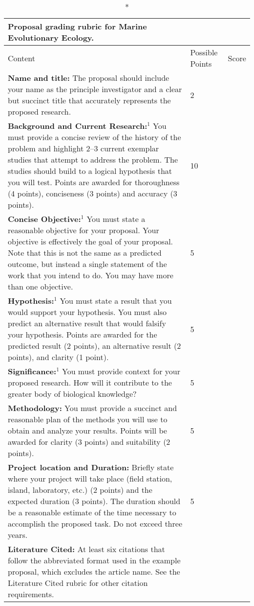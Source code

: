 \documentclass[10pt]{article}
\begin{document}
{\small
\begin{longtable}[l]{@{}L{11cm}C{3cm}L{1cm}@{}}
\caption*{\textbf{Proposal grading rubric for Marine Evolutionary Ecology.}}\\
\toprule
Content	&	Possible Points	&	Score \\
\midrule
\textbf{Name and title:}  The proposal should include your name as the principle investigator and a clear but succinct title that accurately represents the proposed research. &
2 & \\
\midrule%
\textbf{Background and Current Research:}$^1$  You must provide a concise review of the history of the problem and highlight 2--3 current exemplar studies that attempt to address the problem.  The studies should build to a logical hypothesis that you will test.  Points are awarded for thoroughness (4 points), conciseness (3 points) and accuracy (3 points). &
10 & \\
\midrule%
\textbf{Concise Objective:}$^1$  You must state a reasonable objective for your proposal.  Your objective is effectively the goal of your proposal.  Note that this is not the same as a predicted outcome, but instead a single statement of the work that you intend to do.  You may have more than one objective. &
5 & \\
\midrule%
\textbf{Hypothesis:}$^1$ You must state a result that you would support your hypothesis. You must also predict an alternative result that would falsify your hypothesis.  Points are awarded for the predicted result (2 points), an alternative result (2 points), and clarity (1 point). &
5 & \\
\midrule%
\textbf{Significance:}$^1$ You must provide context for your proposed research.  How will it contribute to the greater body of biological knowledge?  &
5 & \\
\midrule%
\textbf{Methodology:} You must provide a succinct and reasonable plan of the methods you will use to obtain and analyze your results.  Points will be awarded for clarity (3 points) and suitability (2 points). &
5 & \\
\midrule%
\textbf{Project location and Duration:}  Briefly state where your project will take place (field station, island, laboratory, etc.) (2 points) and the expected duration (3 points).  The duration should be a reasonable estimate of the time necessary to accomplish the proposed task.  Do not exceed three years. &
5 & \\
\midrule%
\textbf{Literature Cited:} At least six citations that follow the abbreviated format used in the example proposal, which excludes the article name. See the Literature Cited rubric for other citation requirements. &

\end{longtable}}
\end{document}
